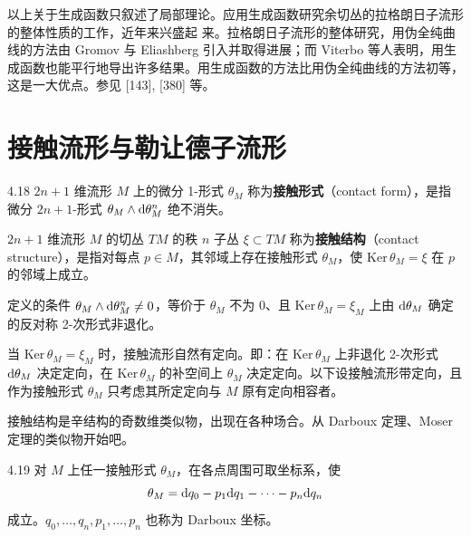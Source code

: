 以上关于生成函数只叙述了局部理论。应用生成函数研究余切丛的拉格朗日子流形的整体性质的工作，近年来兴盛起
来。拉格朗日子流形的整体研究，用伪全纯曲线的方法由 Gromov 与 Eliashberg 引入并取得进展；而 Viterbo 等人表明，用生成函数也能平行地导出许多结果。用生成函数的方法比用伪全纯曲线的方法初等，这是一大优点。参见 [143], [380] 等。

\section{接触流形与勒让德子流形}


\begin{definition}{4.18}
  $2n+1$ 维流形 $M$ 上的微分 1-形式 $\theta_M$ 称为\textbf{接触形式}（contact form），是指微分 $2n+1$-形式 $\theta_M\wedge\mathrm{d}\theta_M^n$ 绝不消失。

  $2n+1$ 维流形 $M$ 的切丛 $TM$ 的秩 $n$ 子丛 $\xi\subset TM$ 称为\textbf{接触结构}（contact structure），是指对每点 $p\in M$，其邻域上存在接触形式 $\theta_M$，使 $\mathrm{Ker}\,\theta_M=\xi$ 在 $p$ 的邻域上成立。
\end{definition}

定义的条件 $\theta_M\wedge\mathrm{d}\theta_M^n\neq0$，等价于 $\theta_M$ 不为 $0$、且 $\mathrm{Ker}\,\theta_M=\xi_M$ 上由 $\mathrm{d}\theta_M$ 确定的反对称 2-次形式非退化。

当 $\mathrm{Ker}\,\theta_M=\xi_M$ 时，接触流形自然有定向。即：在 $\mathrm{Ker}\,\theta_M$ 上非退化 2-次形式 $\mathrm{d}\theta_M$ 决定定向，在 $\mathrm{Ker}\,\theta_M$ 的补空间上 $\theta_M$ 决定定向。以下设接触流形带定向，且作为接触形式 $\theta_M$ 只考虑其所定定向与 $M$ 原有定向相容者。

接触结构是辛结构的奇数维类似物，出现在各种场合。从 Darboux 定理、Moser 定理的类似物开始吧。

\begin{theorem}{4.19}
  对 $M$ 上任一接触形式 $\theta_M$，在各点周围可取坐标系，使
  \[
    \theta_M=\mathrm{d} q_0-p_1\mathrm{d} q_1-\dots-p_n\mathrm{d} q_n
  \]
  成立。$q_0,\dots,q_n,p_1,\dots,p_n$ 也称为 Darboux 坐标。
\end{theorem}

